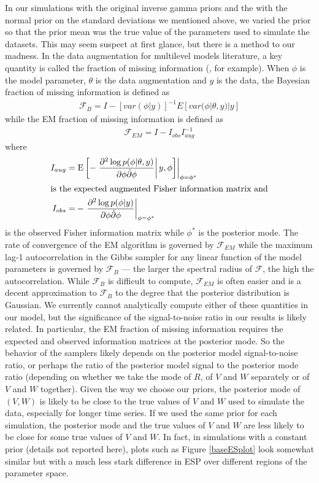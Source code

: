 \documentclass{article}
\begin{document}
In our simulations with the original inverse gamma priors and the with the normal prior on the standard deviations we mentioned above, we varied the prior so that the prior mean was the true value of the parameters used to simulate the datasets. This may seem suspect at first glance, but there is a method to our madness. In the data augmentation for multilevel models literature, a key quantity is called the fraction of missing information (\citet{van2001art}, for example). When $\phi$ is the model parameter, $\theta$ is the data augmentation and $y$ is the data, the Bayesian fraction of missing information is defined as
\begin{align*}
  \mathcal{F}_B = I - [var(\phi|y)]^{-1}E[var(\phi|\theta,y)|y]
\end{align*}
while the EM fraction of missing information is defined as
\begin{align*}
  \mathcal{F}_{EM} = I - I_{obs}I_{aug}^{-1}
\end{align*}
where 
\begin{align*}
  I_{aug}=& \left.\mathrm{E} \left[-\left.\frac{\partial^2 \log p(\phi|\theta,y)}{\partial \phi \dot \partial \phi}\right| y,\phi\right]\right|_{\phi=\phi^*}\\
  \intertext{is the expected augmented Fisher information matrix and}
  I_{obs} =& -\left.\frac{\partial^2\log p(\phi|y)}{\partial\phi \dot \partial\phi}\right|_{\phi=\phi^*}
\end{align*}
is the observed Fisher information matrix while $\phi^*$ is the posterior mode. The rate of convergence of the EM algorithm is governed by $\mathcal{F}_{EM}$ while the maximum lag-1 autocorrelation in the Gibbs sampler for any linear function of the model parameters is governed by $\mathcal{F}_{B}$ --- the larger the spectral radius of $\mathcal{F}$, the high the autocorrelation. While $\mathcal{F}_{B}$ is difficult to compute, $\mathcal{F}_{EM}$ is often easier and is a decent approximation to $\mathcal{F}_{B}$ to the degree that the posterior distribution is Gaussian. We currently cannot analytically compute either of these quantities in our model, but the significance of the signal-to-noise ratio in our results is likely related. In particular, the EM fraction of missing information requires the expected and observed information matrices at the posterior mode. So the behavior of the samplers likely depends on the posterior model signal-to-noise ratio, or perhaps the ratio of the posterior model signal to the posterior mode ratio (depending on whether we take the mode of $R$, of $V$ and $W$ separately or of $V$ and $W$ together). Given the way we choose our priors, the posterior mode of $(V,W)$ is likely to be close to the true values of $V$ and $W$ used to simulate the data, especially for longer time series. If we used the same prior for each simulation, the posterior mode and the true values of $V$ and $W$ are less likely to be close for some true values of $V$ and $W$. In fact, in simulations with a constant prior (details not reported here), plots such as Figure \ref{baseESplot} look somewhat similar but with a much less stark difference in ESP over different regions of the parameter space.
\end{document}
